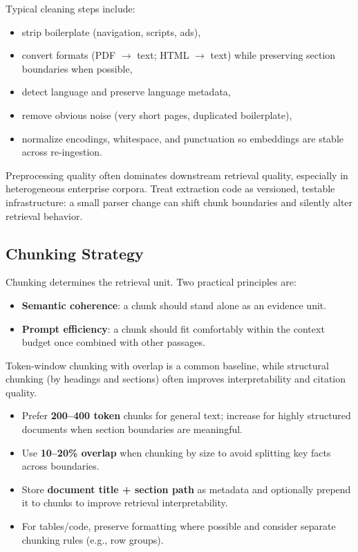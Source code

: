 Typical cleaning steps include:
\begin{itemize}
    \item strip boilerplate (navigation, scripts, ads),
    \item convert formats (PDF $\rightarrow$ text; HTML $\rightarrow$ text) while preserving section boundaries when possible,
    \item detect language and preserve language metadata,
    \item remove obvious noise (very short pages, duplicated boilerplate),
    \item normalize encodings, whitespace, and punctuation so embeddings are stable across re-ingestion.
\end{itemize}
Preprocessing quality often dominates downstream retrieval quality, especially in heterogeneous enterprise corpora. Treat extraction code as versioned, testable infrastructure: a small parser change can shift chunk boundaries and silently alter retrieval behavior.

\subsection{Chunking Strategy}
Chunking determines the retrieval unit. Two practical principles are:
\begin{itemize}
    \item \textbf{Semantic coherence}: a chunk should stand alone as an evidence unit.
    \item \textbf{Prompt efficiency}: a chunk should fit comfortably within the context budget once combined with other passages.
\end{itemize}
Token-window chunking with overlap is a common baseline, while structural chunking (by headings and sections) often improves interpretability and citation quality.

\begin{tcolorbox}[
  title={\textbf{Chunking heuristics that work in practice}},
  colback=green!5,
  colframe=green!40!black,
  colbacktitle=green!20,
  coltitle=black,
  fonttitle=\bfseries,
  boxrule=0.7pt,
  arc=4pt,
  left=5mm, right=5mm, top=4mm, bottom=4mm,
  before skip=6pt,
  after skip=6pt
]
\small
\begin{itemize}[leftmargin=1.5em, itemsep=3pt]
  \item Prefer \textbf{200--400 token} chunks for general text; increase for highly structured documents when section boundaries are meaningful.
  \item Use \textbf{10--20\% overlap} when chunking by size to avoid splitting key facts across boundaries.
  \item Store \textbf{document title + section path} as metadata and optionally prepend it to chunks to improve retrieval interpretability.
  \item For tables/code, preserve formatting where possible and consider separate chunking rules (e.g., row groups).
\end{itemize}
\end{tcolorbox}

